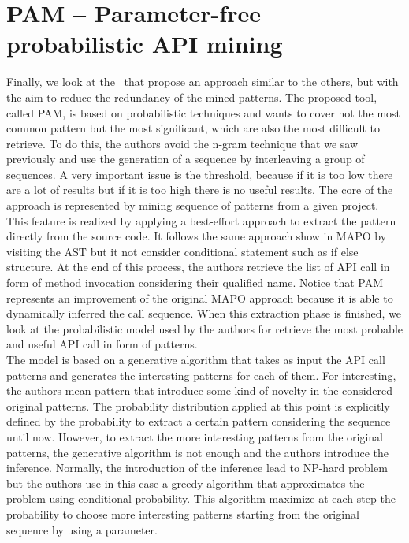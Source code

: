 \section{PAM -- Parameter-free 
probabilistic API mining}
Finally, we look at the~\cite{fowkes_parameter-free_2016} that propose an approach similar to the others, but with the aim to reduce the redundancy of the mined patterns. The proposed tool, called PAM, is based on probabilistic techniques and wants to cover not the most common pattern but the most significant, which are also the most difficult to retrieve. To do this, the authors avoid the n-gram technique that we saw previously and use the generation of a sequence by interleaving a group of sequences. A very important issue is the threshold, because if it is too low there are a lot of results but if it is too high there is no useful results. The core of the approach is represented by mining sequence of patterns from a given project. \\
This feature is realized by applying a best-effort approach to extract the pattern directly from the source code. It follows the same approach show in MAPO by visiting the AST but it not consider conditional statement such as if else structure. At the end of this process, the authors retrieve the list of API call in form of method invocation considering their qualified name. Notice that PAM represents an improvement of the original MAPO approach because it is able to dynamically inferred the call sequence. When this extraction phase is finished, we look at the probabilistic model used by the authors for retrieve the most probable and useful API call in form of patterns. \\
The model is based on a generative algorithm that takes as input the API call patterns and generates the interesting patterns for each of them. For interesting, the authors mean pattern that introduce some kind of novelty in the considered original patterns. The probability distribution applied at this point is explicitly defined by the probability to extract a certain pattern considering the sequence until now. However, to extract the more interesting patterns from the original patterns, the generative algorithm is not enough and the authors introduce the inference. Normally, the introduction of the inference lead to NP-hard problem but the authors use in this case a greedy algorithm that approximates the problem using conditional probability. This algorithm maximize at each step the probability to choose more interesting patterns starting from the original sequence by using a parameter. \newline
